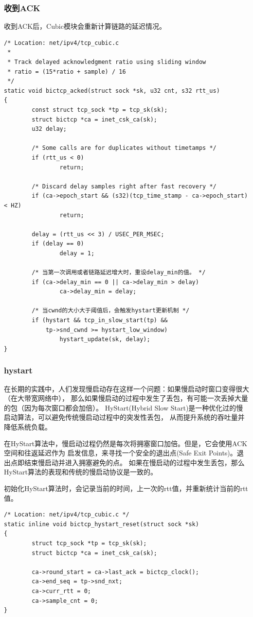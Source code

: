 \subsubsection{收到ACK}
收到ACK后，Cubic模块会重新计算链路的延迟情况。
\begin{verbatim}
/* Location: net/ipv4/tcp_cubic.c
 *
 * Track delayed acknowledgment ratio using sliding window
 * ratio = (15*ratio + sample) / 16
 */
static void bictcp_acked(struct sock *sk, u32 cnt, s32 rtt_us)
{
        const struct tcp_sock *tp = tcp_sk(sk);
        struct bictcp *ca = inet_csk_ca(sk);
        u32 delay;

        /* Some calls are for duplicates without timetamps */
        if (rtt_us < 0)
                return;

        /* Discard delay samples right after fast recovery */
        if (ca->epoch_start && (s32)(tcp_time_stamp - ca->epoch_start) < HZ)
                return;

        delay = (rtt_us << 3) / USEC_PER_MSEC;
        if (delay == 0)
                delay = 1;

        /* 当第一次调用或者链路延迟增大时，重设delay_min的值。 */
        if (ca->delay_min == 0 || ca->delay_min > delay)
                ca->delay_min = delay;

        /* 当cwnd的大小大于阈值后，会触发hystart更新机制 */
        if (hystart && tcp_in_slow_start(tp) &&
            tp->snd_cwnd >= hystart_low_window)
                hystart_update(sk, delay);
}
\end{verbatim}

\subsubsection{hystart}
在长期的实践中，人们发现慢启动存在这样一个问题：如果慢启动时窗口变得很大（在大带宽网络中），
那么如果慢启动的过程中发生了丢包，有可能一次丢掉大量的包（因为每次窗口都会加倍）。
HyStart(Hybrid Slow Start)是一种优化过的慢启动算法，可以避免传统慢启动过程中的突发性丢包，
从而提升系统的吞吐量并降低系统负载。

在HyStart算法中，慢启动过程仍然是每次将拥塞窗口加倍。但是，它会使用ACK空间和往返延迟作为
启发信息，来寻找一个安全的退出点(Safe Exit Points)。退出点即结束慢启动并进入拥塞避免的点。
如果在慢启动的过程中发生丢包，那么HyStart算法的表现和传统的慢启动协议是一致的。

初始化HyStart算法时，会记录当前的时间，上一次的rtt值，并重新统计当前的rtt值。
\begin{verbatim}
/* Location: net/ipv4/tcp_cubic.c */
static inline void bictcp_hystart_reset(struct sock *sk)
{
        struct tcp_sock *tp = tcp_sk(sk);
        struct bictcp *ca = inet_csk_ca(sk);

        ca->round_start = ca->last_ack = bictcp_clock();
        ca->end_seq = tp->snd_nxt;
        ca->curr_rtt = 0;
        ca->sample_cnt = 0;
}
\end{verbatim}

